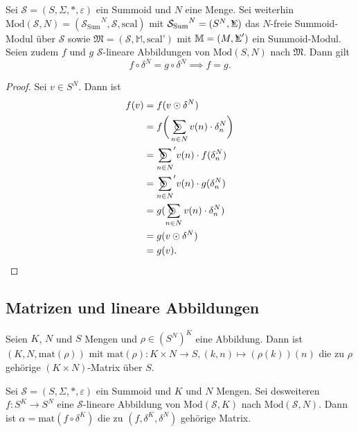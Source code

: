 \documentclass{article}
\DeclareMathOperator*{\Sigmacirc}{%
  \ThisStyle{\mathop{\ensurestackMath{\stackinset{c}{-0.75\LMpt}{c}{}{%
  \rotatebox[origin=lb]{-90}{$\circ$}}{\SavedStyle\Sigma}}}}}
\DeclareMathOperator*{\sumcirc}{%
  \ThisStyle{\mathop{\ensurestackMath{\stackinset{c}{-1.5\LMpt}{c}{}{%
  \rotatebox[origin=lb]{-90}{$\SavedStyle\scalerel*{\bm\Circle}{%
  i}$}}{\SavedStyle\sum}}}}}
\begin{document}
\begin{theorem}
  Sei $\mathcal{S} = (S, \Sigma, \ast, \varepsilon)$ ein Summoid und $N$ eine Menge.
  Sei weiterhin $\text{Mod}(\mathcal{S}, N) = ({\mathcal{S}_\text{Sum}}^N, \mathcal{S}, \text{scal})$
  mit ${\mathcal{S}_\text{Sum}}^N = (S^N, \Sigmacirc)$ das $N$-freie Summoid-Modul über $\mathcal{S}$
  sowie $\mathfrak{M} = (\mathcal{S}, \mathbb{M}, \text{scal'})$
  mit $\mathbb{M} = (M, \Sigmacirc')$ ein Summoid-Modul.
  Seien zudem $f$ und $g$ $\mathcal{S}$-lineare Abbildungen von $\text{Mod}(S, N)$ nach $\mathfrak{M}$.
  Dann gilt
  \begin{equation*}
    f \circ \delta^N = g \circ \delta^N \implies f = g.
  \end{equation*}
\end{theorem}
\begin{proof}
  Sei $v \in S^N$. Dann ist
  \begin{align*}
    f(v) 
    &= f(v \odot \delta^N) \\
    &= f\bigg(\sumcirc_{n \in N}v(n) \cdot \delta^N_n\bigg) \\
    &= {\sumcirc_{n \in N}}' v(n) \cdot f(\delta^N_n) \\
    &= {\sumcirc_{n \in N}}' v(n) \cdot g(\delta^N_n) \\
    &= g(\sumcirc_{n \in N} v(n) \cdot \delta^N_n) \\
    &= g(v \odot \delta^N) \\
    &= g(v). 
  \end{align*}
\end{proof}

\subsection{Matrizen und lineare Abbildungen}

\begin{definition}
  Seien $K$, $N$ und $S$ Mengen und $\rho \in (S^N)^K$ eine Abbildung.
  Dann ist $(K, N, \text{mat}(\rho))$ mit $\text{mat}(\rho) \colon K \times N \to S, (k, n) \mapsto (\rho(k))(n)$
  die zu $\rho$ gehörige $(K \times N)$-Matrix über $S$.
\end{definition}

\begin{definition}
  Sei $\mathcal{S} = (S, \Sigma, \ast, \varepsilon)$ ein Summoid
  und $K$ und $N$ Mengen.
  Sei desweiteren $f \colon S^K \to S^N$ eine $\mathcal{S}$-lineare
  Abbildung von $\text{Mod}(\mathcal{S}, K)$ nach $\text{Mod}(\mathcal{S}, N)$.
  Dann ist $\alpha = \text{mat}(f \circ \delta^K)$
  die zu $(f, \delta^K, \delta^N)$ gehörige Matrix.
\end{definition}
\end{document}
